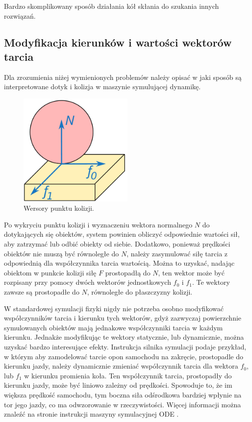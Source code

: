 		Bardzo skomplikowany sposób działania kół skłania do szukania innych rozwiązań.

	\subsection{Modyfikacja kierunków i wartości wektorów tarcia}
		\label{sec:friction}
		Dla zrozumienia niżej wymienionych problemów należy opisać w jaki sposób są interpretowane dotyk i kolizja w maszynie symulującej dynamikę.

		\begin{figure}[h]
		\centering
		\includegraphics[width=0.5\textwidth]{graphics/friction.pdf}
		\caption{Wersory punktu kolizji.}
		\label{fig:ode_collision}
		\end{figure} 

		Po wykryciu punktu kolizji i wyznaczeniu wektora normalnego $N$ do dotykających się obiektów, system powinien obliczyć odpowiednie wartości sił, 
		aby zatrzymać lub odbić obiekty od siebie.
		Dodatkowo, ponieważ prędkości obiektów nie muszą być równoległe do $N$, należy zasymulować siłę tarcia z odpowiednią dla współczynnika tarcia wartością.
		Można to uzyskać, nadając obiektom w punkcie kolizji siłę $F$ prostopadłą do $N$, 
		ten wektor może być rozpisany przy pomocy dwóch wektorów jednostkowych $f_0$ i $f_1$. 
		Te wektory zawsze są prostopadłe do $N$, równoległe do płaszczyzny kolizji.

		W standardowej symulacji fizyki nigdy nie potrzeba osobno modyfikować współczynników tarcia i kierunku tych wektorów, 
		gdyż zazwyczaj powierzchnie symulowanych obiektów mają jednakowe współczynniki tarcia w każdym kierunku.
		Jednakże modyfikując te wektory statycznie, lub dynamicznie, można uzyskać bardzo interesujące efekty.
		Instrukcja silnika symulacji podaje przykład, w którym aby zamodelować tarcie opon samochodu na zakręcie, prostopadle do kierunku jazdy, 
		należy dynamicznie zmieniać współczynnik tarcia dla wektora $f_0$, lub $f_1$ w kierunku promienia koła.
		Ten współczynnik tarcia, prostopadły do kierunku jazdy, może być liniowo zależny od prędkości.
		Spowoduje to, że im większa prędkość samochodu, tym boczna siła odśrodkowa bardziej wpłynie na tor jego jazdy, co ma odwzorowanie w rzeczywistości.
		Więcej informacji można znaleźć na stronie instrukcji maszyny symulacyjnej ODE \cite{ode_contact}.

